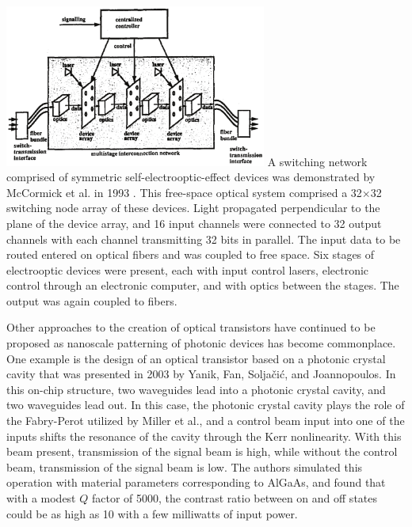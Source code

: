 \includegraphics[width=8.6cm]{figures/_optical_switching_network.pdf}
A switching network comprised of symmetric self-electrooptic-effect devices was demonstrated by McCormick et al. in 1993 \cite{mccl1993}. This free-space optical system comprised a 32$\times$32 switching node array of these devices. Light propagated perpendicular to the plane of the device array, and 16 input channels were connected to 32 output channels with each channel transmitting 32 bits in parallel. The input data to be routed entered on optical fibers and was coupled to free space. Six stages of electrooptic devices were present, each with input control lasers, electronic control through an electronic computer, and with optics between the stages. The output was again coupled to fibers.

Other approaches to the creation of optical transistors have continued to be proposed as nanoscale patterning of photonic devices has become commonplace. One example is the design of an optical transistor based on a photonic crystal cavity \cite{yafa2003} that was presented in 2003 by Yanik, Fan, Solja\v{c}i\'{c}, and Joannopoulos. In this on-chip structure, two waveguides lead into a photonic crystal cavity, and two waveguides lead out. In this case, the photonic crystal cavity plays the role of the Fabry-Perot utilized by Miller et al., and a control beam input into one of the inputs shifts the resonance of the cavity through the Kerr nonlinearity. With this beam present, transmission of the signal beam is high, while without the control beam, transmission of the signal beam is low. The authors simulated this operation with material parameters corresponding to AlGaAs, and found that with a modest $Q$ factor of 5000, the contrast ratio between on and off states could be as high as 10 with a few milliwatts of input power. 

